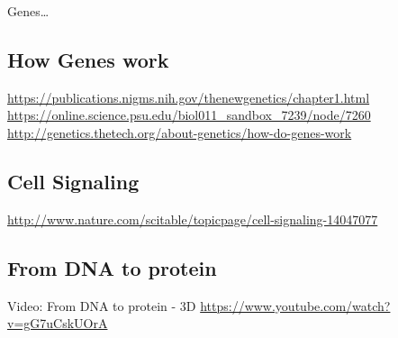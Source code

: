 \documentclass[11pt, a4paper, oneside]{article}   	%
\begin{document}
Genes\ldots

\subsection{How Genes work}
\url{https://publications.nigms.nih.gov/thenewgenetics/chapter1.html}
\url{https://online.science.psu.edu/biol011_sandbox_7239/node/7260}
\url{http://genetics.thetech.org/about-genetics/how-do-genes-work}

\subsection{Cell Signaling}
\url{http://www.nature.com/scitable/topicpage/cell-signaling-14047077}

\subsection{From DNA to protein}

Video: From DNA to protein - 3D
\url{https://www.youtube.com/watch?v=gG7uCskUOrA}
\end{document}
